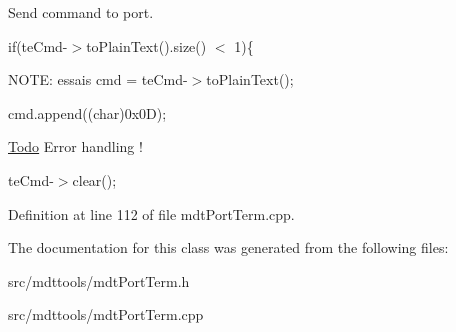 Send command to port. 



if(teCmd-\/$>$toPlainText().size() $<$ 1)\{

NOTE: essais cmd = teCmd-\/$>$toPlainText();

cmd.append((char)0x0D);

\begin{Desc}
\item[\hyperlink{todo__todo000057}{Todo}]Error handling ! \end{Desc}


teCmd-\/$>$clear(); 



Definition at line 112 of file mdtPortTerm.cpp.



The documentation for this class was generated from the following files:\begin{DoxyCompactItemize}
\item 
src/mdttools/mdtPortTerm.h\item 
src/mdttools/mdtPortTerm.cpp\end{DoxyCompactItemize}
